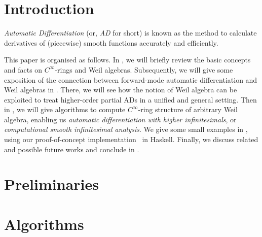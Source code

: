 \documentclass[%
  sigconf,authorversion,screen]{acmart}
\begin{document}

\maketitle

\section{Introduction}\label{sec:intro}
\sloppy
\emph{Automatic Differentiation} (or, \emph{AD} for short) is known as the method to calculate derivatives of (piecewise) smooth functions accurately and efficiently.

This paper is organised as follows.
In , we will briefly review the basic concepts and facts on $C^\infty$-rings and Weil algebras.
Subsequently, we will give some exposition of the connection between forward-mode automatic differentiation and Weil algebras in .
There, we will see how the notion of Weil algebra can be exploited to treat higher-order partial ADs in a unified and general setting.
Then in , we will give algorithms to compute $C^\infty$-ring structure of arbitrary Weil algebra, enabling us \emph{automatic differentiation with higher infinitesimals}, or \emph{computational smooth infinitesimal analysis}.
We give some small examples in , using our proof-of-concept implementation~\cite{Ishii:2020aa} in Haskell.
Finally, we discuss related and possible future works and conclude in .


\section{Preliminaries}

\section{Algorithms}
\end{document}
